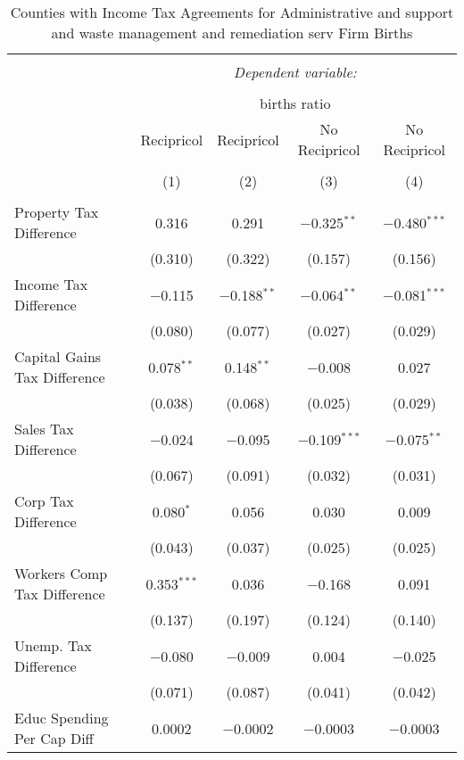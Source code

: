 
\begin{table}[!htbp] \centering 
  \caption{Counties with Income Tax Agreements for  Administrative and support and waste management and remediation serv Firm Births} 
  \label{56agreement} 
\begin{tabular}{@{\extracolsep{5pt}}lcccc} 
\\[-1.8ex]\hline 
\hline \\[-1.8ex] 
 & \multicolumn{4}{c}{\textit{Dependent variable:}} \\ 
\cline{2-5} 
\\[-1.8ex] & \multicolumn{4}{c}{births ratio} \\ 
 & Recipricol & Recipricol & No Recipricol & No Recipricol \\ 
\\[-1.8ex] & (1) & (2) & (3) & (4)\\ 
\hline \\[-1.8ex] 
 Property Tax Difference & 0.316 & 0.291 & $-$0.325$^{**}$ & $-$0.480$^{***}$ \\ 
  & (0.310) & (0.322) & (0.157) & (0.156) \\ 
  Income Tax Difference & $-$0.115 & $-$0.188$^{**}$ & $-$0.064$^{**}$ & $-$0.081$^{***}$ \\ 
  & (0.080) & (0.077) & (0.027) & (0.029) \\ 
  Capital Gains Tax Difference & 0.078$^{**}$ & 0.148$^{**}$ & $-$0.008 & 0.027 \\ 
  & (0.038) & (0.068) & (0.025) & (0.029) \\ 
  Sales Tax Difference & $-$0.024 & $-$0.095 & $-$0.109$^{***}$ & $-$0.075$^{**}$ \\ 
  & (0.067) & (0.091) & (0.032) & (0.031) \\ 
  Corp Tax Difference & 0.080$^{*}$ & 0.056 & 0.030 & 0.009 \\ 
  & (0.043) & (0.037) & (0.025) & (0.025) \\ 
  Workers Comp Tax Difference & 0.353$^{***}$ & 0.036 & $-$0.168 & 0.091 \\ 
  & (0.137) & (0.197) & (0.124) & (0.140) \\ 
  Unemp. Tax Difference & $-$0.080 & $-$0.009 & 0.004 & $-$0.025 \\ 
  & (0.071) & (0.087) & (0.041) & (0.042) \\ 
  Educ Spending Per Cap Diff & 0.0002 & $-$0.0002 & $-$0.0003 & $-$0.0003 \\ 

\end{tabular}
\end{table}

